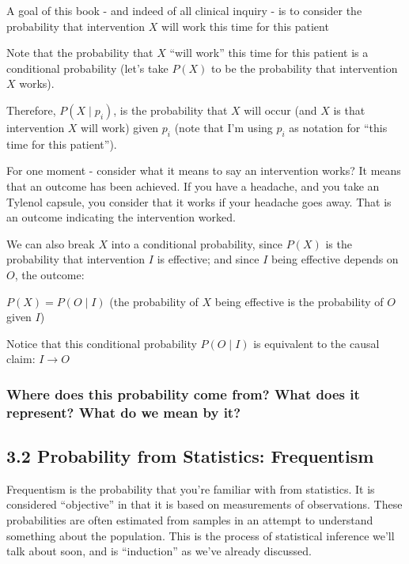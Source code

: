 \documentclass[
]{book}
\begin{document}
A goal of this book - and indeed of all clinical inquiry - is to consider the probability that intervention \(X\) will work this time for this patient

Note that the probability that \(X\) ``will work'' this time for this patient is a conditional probability (let's take \(P(X)\) to be the probability that intervention \(X\) works).

Therefore, \(P(X \mid p_i)\), is the probability that \(X\) will occur (and \(X\) is that intervention \(X\) will work) given \(p_i\) (note that I'm using \(p_i\) as notation for ``this time for this patient'').

For one moment - consider what it means to say an intervention works? It means that an outcome has been achieved. If you have a headache, and you take an Tylenol capsule, you consider that it works if your headache goes away. That is an outcome indicating the intervention worked.

We can also break \(X\) into a conditional probability, since \(P(X)\) is the probability that intervention \(I\) is effective; and since \(I\) being effective depends on \(O\), the outcome:

\(P(X) = P(O \mid I)\) (the probability of \(X\) being effective is the probability of \(O\) given \(I\))

Notice that this conditional probability \(P(O \mid I)\) is equivalent to the causal claim: \(I \rightarrow O\)

\hypertarget{where-does-this-probability-come-from-what-does-it-represent-what-do-we-mean-by-it}{%
\subsubsection{Where does this probability come from? What does it represent? What do we mean by it?}\label{where-does-this-probability-come-from-what-does-it-represent-what-do-we-mean-by-it}}

\hypertarget{probability-from-statistics-frequentism}{%
\subsection{3.2 Probability from Statistics: Frequentism}\label{probability-from-statistics-frequentism}}

Frequentism is the probability that you're familiar with from statistics. It is considered ``objective'' in that it is based on measurements of observations. These probabilities are often estimated from samples in an attempt to understand something about the population. This is the process of statistical inference we'll talk about soon, and is ``induction'' as we've already discussed.
\end{document}
